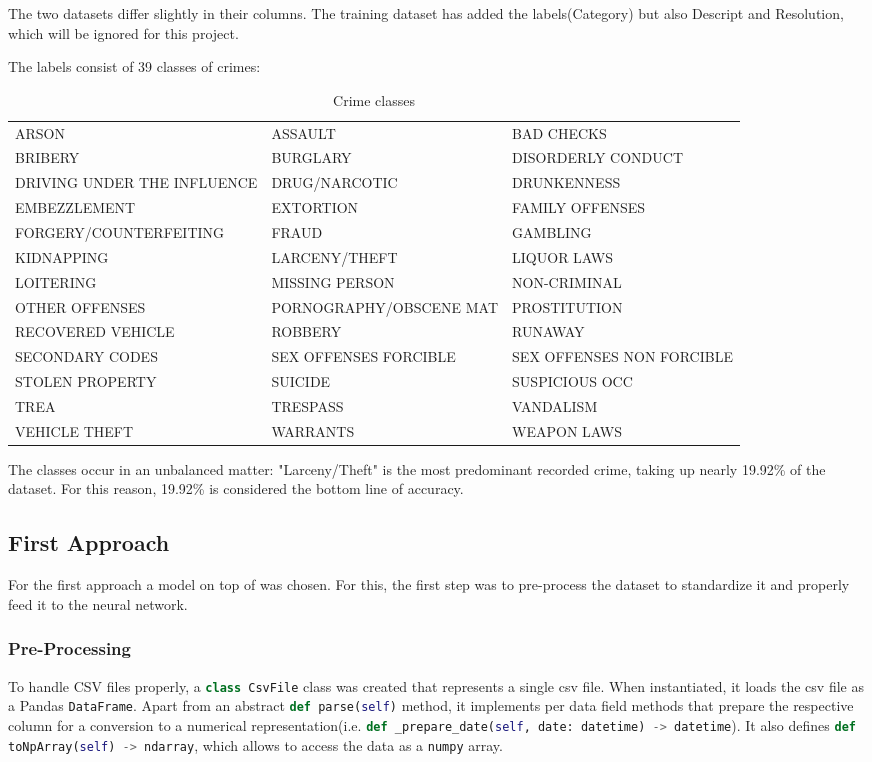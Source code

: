 \documentclass[titlepage,12pt]{article}
\newcommand{\inlinelisting}[1]{\colorbox{BackgroundColour!95!ForegroundColour}{\color{ForegroundColour!70!BackgroundColour}\lstinline[columns=fixed,language=python]{#1}}}
\begin{document}
The two datasets differ slightly in their columns. The training dataset has added the labels(Category) but also Descript and Resolution, which will be ignored for this project.

The labels consist of 39 classes of crimes:

\begin{table}[htbp]
\centering
\scriptsize
\setlength\tabcolsep{2pt}
\begin{tabular}{|lll|}\hline
ARSON&ASSAULT&BAD CHECKS\\
BRIBERY&BURGLARY&DISORDERLY CONDUCT\\
DRIVING UNDER THE INFLUENCE&DRUG/NARCOTIC&DRUNKENNESS\\
EMBEZZLEMENT&EXTORTION&FAMILY OFFENSES\\
FORGERY/COUNTERFEITING&FRAUD&GAMBLING\\
KIDNAPPING&LARCENY/THEFT&LIQUOR LAWS\\
LOITERING&MISSING PERSON&NON-CRIMINAL\\
OTHER OFFENSES&PORNOGRAPHY/OBSCENE MAT&PROSTITUTION\\
RECOVERED VEHICLE&ROBBERY&RUNAWAY\\
SECONDARY CODES&SEX OFFENSES FORCIBLE&SEX OFFENSES NON FORCIBLE\\
STOLEN PROPERTY&SUICIDE&SUSPICIOUS OCC\\
TREA&TRESPASS&VANDALISM\\
VEHICLE THEFT&WARRANTS&WEAPON LAWS\\
\hline
\end{tabular}
\caption{Crime classes}
\label{tab:lables}
\end{table}

The classes occur in an unbalanced matter: "Larceny/Theft" is the most predominant recorded crime, taking up nearly 19.92\% of the dataset. For this reason, 19.92\% is considered the bottom line of accuracy.

\subsection{First Approach}\label{ss:first_approach}
For the first approach a \cite{keras} model on top of \cite{tensorflow} was chosen. For this, the first step was to pre-process the dataset to standardize it and properly feed it to the neural network.

\subsubsection{Pre-Processing}\label{sss:preprocessing}
To handle CSV files properly, a \inlinelisting{class CsvFile} class was created that represents a single csv file. When instantiated, it loads the csv file as a Pandas \inlinelisting{DataFrame}. Apart from an abstract \inlinelisting{def parse(self)} method, it implements per data field methods that prepare the respective column for a conversion to a numerical representation(i.e. \inlinelisting{def _prepare_date(self, date: datetime) -> datetime}). It also defines \inlinelisting{def toNpArray(self) -> ndarray}, which allows to access the data as a \inlinelisting{numpy} array.
\end{document}
